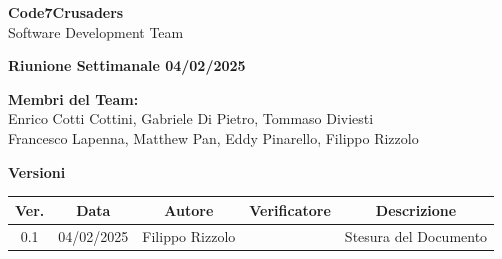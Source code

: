 \documentclass{article}
\begin{document}
\begin{titlepage}
    {\Huge \textbf{Code7Crusaders}}\\
    \vspace{0.5cm}
    {\Large Software Development Team}\\
    \vspace{2cm}
        
        {\large \textbf{Riunione Settimanale 04/02/2025}}\\
    \vspace{5cm}                           %
    
    
    \textbf{Membri del Team:}\\
    Enrico Cotti Cottini, Gabriele Di Pietro, Tommaso Diviesti \\
    Francesco Lapenna, Matthew Pan, Eddy Pinarello, Filippo Rizzolo \\
    \vspace{0.5cm}
    
    \vspace{1cm}
\end{titlepage}



\newpage
\begin{table}[h!]
\centering
\textbf{Versioni} \\ %
\vspace{2mm} %
\begin{tabular}{|c|c|c|c|c|}
    \hline
    \textbf{Ver.} & \textbf{Data} & \textbf{Autore} & \textbf{Verificatore} & \textbf{Descrizione} \\
    \hline
    0.1 & 04/02/2025 & Filippo Rizzolo &  & Stesura del Documento \\ 
    \hline                                  %
\end{tabular}
\end{table}



\newpage
\end{document}
